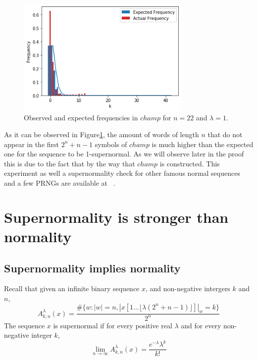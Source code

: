 \documentclass[11pt,a4paper]{tesis}
\begin{document}
\begin{figure}[h]
    \includegraphics[width=0.75\textwidth]{images/champ-22-freq.png}
    \centering
    \caption{Observed and expected frequencies in $champ$ for $n = 22$ and $\lambda = 1$.}
    \label{fig:champ-22-freq}
\end{figure}

As it can be observed in Figure\ref{fig:champ-22-freq}, the amount of words of length $n$ that do not appear in the first $2^n + n - 1$ symbols of $champ$ is much higher than the expected one for the sequence to be 1-supernormal. As we will observe later in the proof this is due to the fact that by the way that $champ$ is constructed.
This experiment as well a supernormality check for other famous normal sequences and a few PRNGs are available at ~\cite{Puterman}.


\chapter{Supernormality is stronger than normality}
\section{Supernormality implies normality}

Recall that given an infinite  binary sequence $x$, and non-negative intergers $k$ and $n$,
$$A^\lambda_{k,n}(x) = \frac{\#\{w: |w| = n  , |x[1...\lfloor\lambda(2^n+n-1)\rfloor]|_w = k\}}{2^n}$$
The sequence $x$ is supernormal if for every positive real $\lambda$ and for every non-negative integer $k$,
$$\lim_{n\to\infty} A^\lambda_{k,n}(x) = \frac{e^{-\lambda}\lambda^k}{k!}$$ 
\end{document}
